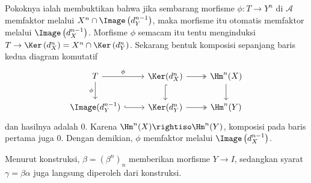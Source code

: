 \begin{bukti}
	Pokoknya ialah membuktikan bahwa jika sembarang morfisme $\phi: T \to Y^n$ di $\mathcal{A}$ memfaktor melalui $X^n \cap \Image\left(d_Y^{n-1} \right)$, maka morfisme itu otomatis memfaktor melalui $\Image\left( d_X^{n-1} \right)$. Morfisme $\phi$ semacam itu tentu menginduksi $T \to \Ker\left( d_X^n \right) = X^n \cap \Ker\left( d_Y^n \right)$. Sekarang bentuk komposisi sepanjang baris kedua diagram komutatif
	\[\begin{tikzcd}
		T \arrow[r, "\phi"] \arrow[d, "\phi"'] & \Ker(d_X^n) \arrow[twoheadrightarrow, r] \arrow[hookrightarrow, d] & \Hm^n(X) \arrow[d] \\
		\Image(d_Y^{n-1}) \arrow[hookrightarrow, r] & \Ker(d_Y^n) \arrow[twoheadrightarrow, r] & \Hm^n(Y)
	\end{tikzcd}\]
	dan hasilnya adalah $0$. Karena $\Hm^n(X) \rightiso \Hm^n(Y)$, komposisi pada baris pertama juga $0$. Dengan demikian, $\phi$ memfaktor melalui $\Image\left( d_X^{n-1} \right)$.
	
	Menurut konstruksi, $\beta = (\beta^n)_n$ memberikan morfisme $Y \to I$, sedangkan syarat $\gamma = \beta\alpha$ juga langsung diperoleh dari konstruksi.
\end{bukti}


